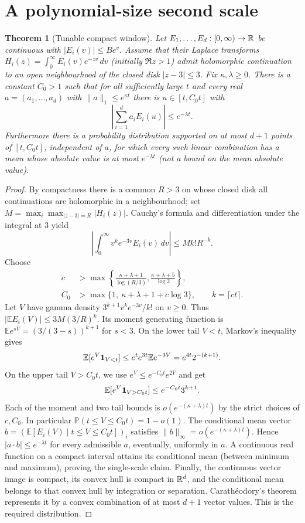 \documentclass[11pt,letterpaper]{article}
\newtheorem{theorem}{Theorem}[section]\newtheorem{lemma}[theorem]{Lemma}\newtheorem{proposition}[theorem]{Proposition}\newtheorem{corollary}[theorem]{Corollary}
\theoremstyle{definition}\newtheorem{definition}[theorem]{Definition}
\theoremstyle{remark}\newtheorem{remark}[theorem]{Remark}
\begin{document}
\section{A polynomial-size second scale}\label{sec:window}
\begin{theorem}[Tunable compact window]\label{thm:window}
Let $E_1,\ldots,E_d:[0,\infty)\to\mathbb R$ be continuous with $|E_i(v)|\le B e^v$. Assume that their Laplace transforms $H_i(z)=\int_0^\infty E_i(v)e^{-zv}\,dv$ (initially $\Re z>1$) admit holomorphic continuation to an open neighbourhood of the closed disk $|z-3|\le3$. Fix $\kappa,\lambda\ge0$. There is a constant $C_0>1$ such that for all sufficiently large $t$ and every real $a=(a_1,\ldots,a_d)$ with $\|a\|_1\le e^{\kappa t}$ there is $u\in[t,C_0t]$ with
\[
\left|\sum_{i=1}^d a_i E_i(u)\right|\le e^{-\lambda t}.
\]
Furthermore there is a probability distribution supported on at most $d+1$ points of $[t,C_0t]$, independent of $a$, for which every such linear combination has a mean whose absolute value is at most $e^{-\lambda t}$ (not a bound on the mean absolute value).
\end{theorem}
\begin{proof}
By compactness there is a common $R>3$ on whose closed disk all continuations are holomorphic in a neighbourhood; set $M=\max_i\max_{|z-3|=R}|H_i(z)|$. Cauchy's formula and differentiation under the integral at $3$ yield
\[
\left|\int_0^\infty v^k e^{-3v}E_i(v)\,dv\right|\le M k! R^{-k}.
\]
Choose
\begin{align*}
c&>\max\left\{\frac{\kappa+\lambda+1}{\log(R/3)},\frac{\kappa+\lambda+5}{\log2}\right\},\\
C_0&>\max\{1,\ \kappa+\lambda+1+c\log3\},\qquad k=\lceil ct\rceil.
\end{align*}
Let $V$ have gamma density $3^{k+1}v^ke^{-3v}/k!$ on $v\ge0$. Thus $|\mathbb E E_i(V)|\le 3M(3/R)^k$. Its moment generating function is $\mathbb E e^{sV}=(3/(3-s))^{k+1}$ for $s<3$. On the lower tail $V<t$, Markov's inequality gives
\[
\mathbb E[e^V\mathbf 1_{V<t}]\le e^t e^{3t}\mathbb E e^{-3V}= e^{4t}2^{-(k+1)}.
\]
On the upper tail $V>C_0t$, we use $e^V\le e^{-C_0t}e^{2V}$ and get
\[
\mathbb E[e^V\mathbf 1_{V>C_0t}]\le e^{-C_0t}3^{k+1}.
\]
Each of the moment and two tail bounds is $o(e^{-(\kappa+\lambda)t})$ by the strict choices of $c,C_0$. In particular $\mathbb P(t\le V\le C_0t)=1-o(1)$. The conditional mean vector $b=(\mathbb E[E_i(V)\mid t\le V\le C_0t])_i$ satisfies $\|b\|_\infty=o(e^{-(\kappa+\lambda)t})$. Hence $|a\cdot b|\le e^{-\lambda t}$ for every admissible $a$, eventually, uniformly in $a$. A continuous real function on a compact interval attains its conditional mean (between minimum and maximum), proving the single-scale claim. Finally, the continuous vector image is compact, its convex hull is compact in $\mathbb R^d$, and the conditional mean belongs to that convex hull by integration or separation. Carath\'eodory's theorem represents it by a convex combination of at most $d+1$ vector values. This is the required distribution.
\end{proof}
\end{document}
